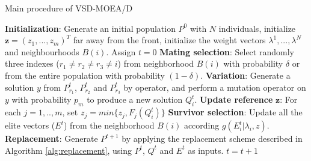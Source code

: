 \begin{algorithm}[!t]
        \caption{Main procedure of VSD-MOEA/D} 
        \begin{small}
\begin{algorithmic}[1]
	\STATE \textbf{Initialization}: Generate an initial population $P^0$ with $N$ individuals, initialize $\mathbf{z} = (z_1, ..., z_m)^T$ far away from the front, initialize the weight vectors $\lambda^1, ..., \lambda^N $ and neighbourhoods $B(i)$. \label{alg_1:1}
        \STATE Assign $t=0$ \label{alg_1:2}
         \label{alg_1:3}
               \STATE \textbf{Mating selection}: Select randomly three indexes ($r_1 \neq r_2 \neq r_3 \neq i$) from neighborhood $B(i)$ with probability $\delta$ or from the entire population with probability $(1-\delta)$. \label{alg_1:4}
	       \STATE \textbf{Variation}: Generate a solution $y$ from $P^t_{r_1}$, $P^t_{r_2}$ and $P^t_{r_3}$ by \DE{} operator, and perform a mutation operator on $y$ with probability $p_m$ to produce a new solution $Q^t_{i}$. \label{alg_1:5}
	       \STATE \textbf{Update reference} $\mathbf{z}$: For each $j=1, .., m$, set $z_j = min\{z_j, F_j(Q^t_i) \}$ \label{alg_1:6}
	       \STATE \textbf{Survivor selection}: Update all the elite vectors ($E^t$) from the neighborhood $B(i)$ according $g(E^t_i | \lambda_i, z)$. \label{alg_1:6}
	   \ENDFOR
	   \STATE \textbf{Replacement}: Generate $P^{t+1}$ by applying the replacement scheme described in  Algorithm \ref{alg:replacement}, using $P^t$, $Q^t$ and $E^t$ as inputs. \label{alg_1:7}
           \STATE $t=t+1$ \label{alg_1:8}
        \ENDWHILE
        \end{algorithmic}
        \end{small}
\label{alg:vsd-moea}
\end{algorithm}




